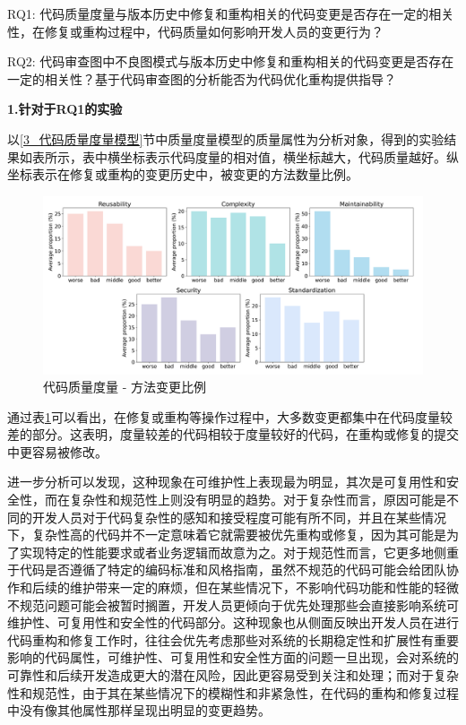 RQ1: 代码质量度量与版本历史中修复和重构相关的代码变更是否存在一定的相关性，在修复或重构过程中，代码质量如何影响开发人员的变更行为？

RQ2: 代码审查图中不良图模式与版本历史中修复和重构相关的代码变更是否存在一定的相关性？基于代码审查图的分析能否为代码优化重构提供指导？


\textbf{1.针对于RQ1的实验}


以\ref{3_代码质量度量模型}节中质量度量模型的质量属性为分析对象，得到的实验结果如表\label{1_度量模型分析实验}所示，表中横坐标表示代码度量的相对值，横坐标越大，代码质量越好。纵坐标表示在修复或重构的变更历史中，被变更的方法数量比例。

\begin{figure}[h]
\centering
\includegraphics[width = 1\textwidth]{figures/3_度量实验.png}
\caption{代码质量度量 - 方法变更比例}
\label{1_度量模型分析实验}
\end{figure}


通过表\ref{1_度量模型分析实验}可以看出，在修复或重构等操作过程中，大多数变更都集中在代码度量较差的部分。这表明，度量较差的代码相较于度量较好的代码，在重构或修复的提交中更容易被修改。

进一步分析可以发现，这种现象在可维护性上表现最为明显，其次是可复用性和安全性，而在复杂性和规范性上则没有明显的趋势。对于复杂性而言，原因可能是不同的开发人员对于代码复杂性的感知和接受程度可能有所不同，并且在某些情况下，复杂性高的代码并不一定意味着它就需要被优先重构或修复，因为其可能是为了实现特定的性能要求或者业务逻辑而故意为之。对于规范性而言，它更多地侧重于代码是否遵循了特定的编码标准和风格指南，虽然不规范的代码可能会给团队协作和后续的维护带来一定的麻烦，但在某些情况下，不影响代码功能和性能的轻微不规范问题可能会被暂时搁置，开发人员更倾向于优先处理那些会直接影响系统可维护性、可复用性和安全性的代码部分。这种现象也从侧面反映出开发人员在进行代码重构和修复工作时，往往会优先考虑那些对系统的长期稳定性和扩展性有重要影响的代码属性，可维护性、可复用性和安全性方面的问题一旦出现，会对系统的可靠性和后续开发造成更大的潜在风险，因此更容易受到关注和处理；而对于复杂性和规范性，由于其在某些情况下的模糊性和非紧急性，在代码的重构和修复过程中没有像其他属性那样呈现出明显的变更趋势。

